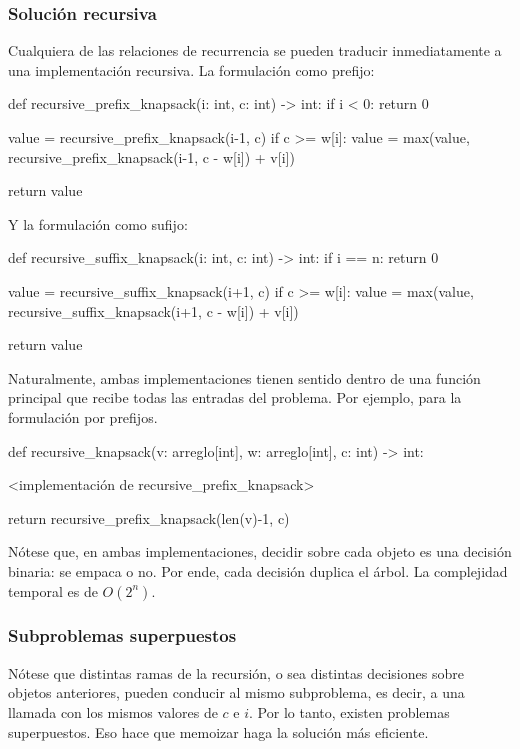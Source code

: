 \subsubsection{Solución recursiva}

Cualquiera de las relaciones de recurrencia se pueden traducir inmediatamente a una implementación recursiva. La formulación como prefijo:
\begin{codeblock}
\begin{pseudocode}
def recursive_prefix_knapsack(i: int, c: int) -> int:
    if i < 0: return 0

    value = recursive_prefix_knapsack(i-1, c)
    if c >= w[i]:
        value = max(value, recursive_prefix_knapsack(i-1, c - w[i]) + v[i])

    return value
\end{pseudocode}
\end{codeblock}

Y la formulación como sufijo:
\begin{pseudocode}
def recursive_suffix_knapsack(i: int, c: int) -> int:
    if i == n: return 0

    value = recursive_suffix_knapsack(i+1, c)
    if c >= w[i]:
        value = max(value, recursive_suffix_knapsack(i+1, c - w[i]) + v[i])

    return value
\end{pseudocode}

Naturalmente, ambas implementaciones tienen sentido dentro de una función principal que recibe todas las entradas del problema. Por ejemplo, para la formulación por prefijos.
\begin{pseudocode}
def recursive_knapsack(v: arreglo[int], w: arreglo[int], c: int) -> int:

    <implementación de recursive_prefix_knapsack>

    return recursive_prefix_knapsack(len(v)-1, c)
\end{pseudocode}

Nótese que, en ambas implementaciones, decidir sobre cada objeto es una decisión binaria: se empaca o no. Por ende, cada decisión duplica el árbol. La complejidad temporal es de \(O(2^n)\).

\subsubsection{Subproblemas superpuestos}

Nótese que distintas ramas de la recursión, o sea distintas decisiones sobre objetos anteriores, pueden conducir al mismo subproblema, es decir, a una llamada con los mismos valores de \(c\) e \(i\). Por lo tanto, existen problemas superpuestos. Eso hace que memoizar haga la solución más eficiente.

